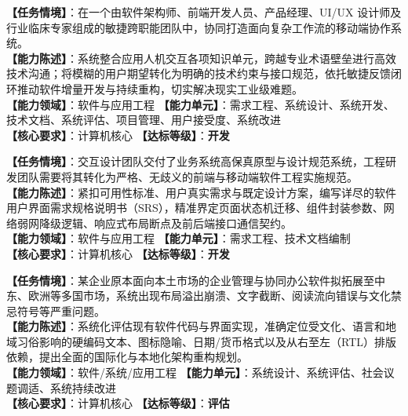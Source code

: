 \begin{taskbox}
\textbf{【任务情境】}：在一个由软件架构师、前端开发人员、产品经理、UI/UX 设计师及行业临床专家组成的敏捷跨职能团队中，协同打造面向复杂工作流的移动端协作系统。\\
\textbf{【能力陈述】}：系统整合应用人机交互各项知识单元，跨越专业术语壁垒进行高效技术沟通；将模糊的用户期望转化为明确的技术约束与接口规范，依托敏捷反馈闭环推动软件增量开发与持续重构，切实解决现实工业级难题。\\
\textbf{【能力领域】}：软件与应用工程 \quad \textbf{【能力单元】}：需求工程、系统设计、系统开发、技术文档、系统评估、项目管理、用户接受度、系统改进\\
\textbf{【核心要求】}：计算机核心 \quad \textbf{【达标等级】}：\textbf{开发}
\end{taskbox}

\begin{taskbox}[任务 5：基于高层设计原型编制高精度用户界面工程开发规格说明书]
\textbf{【任务情境】}：交互设计团队交付了业务系统高保真原型与设计规范系统，工程研发团队需要将其转化为严格、无歧义的前端与移动端软件工程实施规范。\\
\textbf{【能力陈述】}：紧扣可用性标准、用户真实需求与既定设计方案，编写详尽的软件用户界面需求规格说明书（SRS），精准界定页面状态机迁移、组件封装参数、网络弱网降级逻辑、响应式布局断点及前后端接口通信契约。\\
\textbf{【能力领域】}：软件与应用工程 \quad \textbf{【能力单元】}：需求工程、技术文档编制\\
\textbf{【核心要求】}：计算机核心 \quad \textbf{【达标等级】}：\textbf{开发}
\end{taskbox}

\begin{taskbox}
\textbf{【任务情境】}：某企业原本面向本土市场的企业管理与协同办公软件拟拓展至中东、欧洲等多国市场，系统出现布局溢出崩溃、文字截断、阅读流向错误与文化禁忌符号等严重问题。\\
\textbf{【能力陈述】}：系统化评估现有软件代码与界面实现，准确定位受文化、语言和地域习俗影响的硬编码文本、图标隐喻、日期/货币格式以及从右至左（RTL）排版依赖，提出全面的国际化与本地化架构重构规划。\\
\textbf{【能力领域】}：软件/系统/应用工程 \quad \textbf{【能力单元】}：系统设计、系统评估、社会议题调适、系统持续改进\\
\textbf{【核心要求】}：计算机核心 \quad \textbf{【达标等级】}：\textbf{评估}
\end{taskbox}

